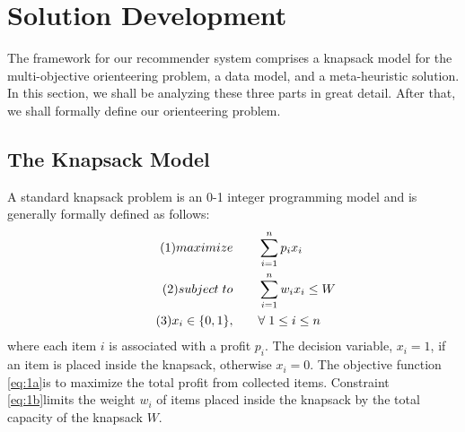 
\chapter{Solution Development}\label{chapter:analysis}
The framework for our recommender system comprises a knapsack model for the multi-objective orienteering problem, a data model, and a meta-heuristic solution. In this section, we shall be analyzing these three parts in great detail. After that, we shall formally define our orienteering problem.

\section{The Knapsack Model}
A standard knapsack problem is an 0-1 integer programming model and is generally formally defined as follows:
\begin{align}\tag{1}
    maximize \qquad &\sum_{i=1}^n p_ix_i\label{eq:1a}\\
   \tag{2} subject \hspace{0.1cm} to \qquad &\sum_{i=1}^n w_ix_i \leq W\label{eq:1b} \\
    \tag{3}x_i \in \{0,1\}, \qquad &\forall \hspace{0.1cm} 1 \leq i \leq n\label{eq:1c}
\end{align}
where each item $i$ is associated with a profit $p_i$. The decision variable, $x_i = 1$, if an item is placed inside the knapsack, otherwise $x_i=0$. The objective function \ref{eq:1a}is to maximize the total profit from collected items. Constraint \ref{eq:1b}limits the weight $w_i$ of items placed inside the knapsack by the total capacity of the knapsack $W$.

